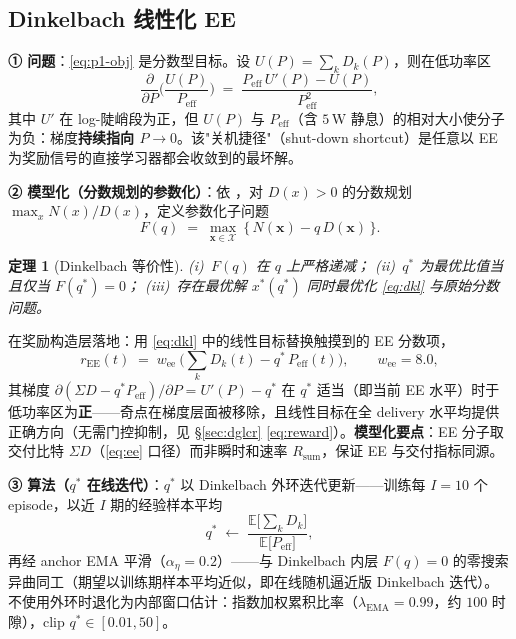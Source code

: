 \documentclass[UTF8,11pt,a4paper]{ctexart}
\theoremstyle{plain}
\newtheorem{theorem}{定理}[section]
\theoremstyle{definition}
\theoremstyle{remark}
\newcommand{\E}{\mathbb{E}}
\newcommand{\vect}[1]{\mathbf{#1}}
\begin{document}
\subsection{Dinkelbach 线性化 EE} \label{sec:dinkelbach}

\textbf{① 问题}：\eqref{eq:p1-obj} 是分数型目标。设 $U(P)=\sum_k D_k(P)$，则在低功率区
\begin{equation}
  \frac{\partial}{\partial P}\Big(\frac{U(P)}{P_{\mathrm{eff}}}\Big)
  \;=\; \frac{P_{\mathrm{eff}}\,U'(P) - U(P)}{P_{\mathrm{eff}}^2},
  \label{eq:ee-grad}
\end{equation}
其中 $U'$ 在 log-陡峭段为正，但 $U(P)$ 与 $P_{\mathrm{eff}}$（含 $5$\,W 静息）的相对大小使分子为负：梯度\textbf{持续指向 $P\to0$}。该"关机捷径"（shut-down shortcut）是任意以 EE 为奖励信号的直接学习器都会收敛到的最坏解。

\textbf{② 模型化（分数规划的参数化）}：依 \cite{dinkelbach1967nonlinear}，对 $D(x)>0$ 的分数规划 $\max_x N(x)/D(x)$，定义参数化子问题
\begin{equation}
  F(q) \;=\; \max_{\vect x\in\mathcal X}\ \big\{\, N(\vect x) - q\,D(\vect x)\,\big\}.
  \label{eq:dkl}
\end{equation}
\begin{theorem}[Dinkelbach 等价性]
(i)~$F(q)$ 在 $q$ 上严格递减；\quad
(ii)~$q^*$ 为最优比值当且仅当 $F(q^*)=0$；\quad
(iii)~存在最优解 $x^*(q^*)$ 同时最优化 \eqref{eq:dkl} 与原始分数问题。
\end{theorem}
在奖励构造层落地：用 \eqref{eq:dkl} 中的线性目标替换触摸到的 EE 分数项，
\begin{equation}
  r_{\mathrm{EE}}(t) \;=\; w_{\mathrm{ee}}\ \big(\textstyle\sum_k D_k(t) - q^*\,P_{\mathrm{eff}}(t)\big),\qquad w_{\mathrm{ee}}=8.0,
  \label{eq:ee-lin}
\end{equation}
其梯度 $\partial(\Sigma D - q^*P_{\mathrm{eff}})/\partial P = U'(P) - q^*$ 在 $q^*$ 适当（即当前 EE 水平）时于低功率区为\textbf{正}——奇点在梯度层面被移除，且线性目标在全 delivery 水平均提供正确方向（无需门控抑制，见 \S\ref{sec:dglcr} \eqref{eq:reward}）。\textbf{模型化要点}：EE 分子取交付比特 $\Sigma D$（\eqref{eq:ee} 口径）而非瞬时和速率 $R_{\mathrm{sum}}$，保证 EE 与交付指标同源。

\textbf{③ 算法（$q^*$ 在线迭代）}：$q^*$ 以 Dinkelbach 外环迭代更新——训练每 $I=10$ 个 episode，以近 $I$ 期的经验样本平均
\begin{equation}
  q^{*} \;\leftarrow\; \frac{\E\big[\sum_k D_k\big]}{\E\big[P_{\mathrm{eff}}\big]},
  \label{eq:dinkelbach}
\end{equation}
再经 anchor EMA 平滑（$\alpha_\eta=0.2$）——与 Dinkelbach 内层 $F(q)=0$ 的零搜索异曲同工（期望以训练期样本平均近似，即在线随机逼近版 Dinkelbach 迭代）。不使用外环时退化为内部窗口估计：指数加权累积比率（$\lambda_{\mathrm{EMA}}=0.99$，约 $100$ 时隙），clip $q^*\in[0.01,50]$。
\end{document}
